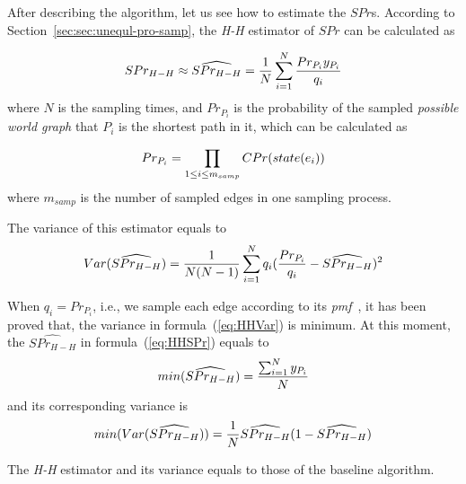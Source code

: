 \documentclass[runningheads,a4paper]{llncs}
\begin{document}
After describing the algorithm, let us see how to estimate the $SPr$s. According to Section~\ref{sec:sec:unequl-pro-samp}, the \emph{H-H} estimator of $SPr$ can be calculated as

\vspace{-0.3cm}
\begin{equation}
\label{eq:HHSPr}
SPr_{H-H}\approx\widehat{SPr_{H-H}}=\frac{1}{N}\sum_{i=1}^N\frac{Pr_{P_i}y_{P_i}}{q_i}
\vspace{-0.2cm}
\end{equation}
where $N$ is the sampling times, and $Pr_{P_i}$ is the probability of the sampled \emph{possible world graph} that $P_i$ is the shortest path in it, which can be calculated as

\vspace{-0.2cm}
\begin{equation}
\label{eq:pos-gra-pro}
Pr_{P_i}=\prod_{1\leq i\leq m_{samp}} CPr(state(e_i))
\vspace{-0.2cm}
\end{equation}
where $m_{samp}$ is the number of sampled edges in one sampling process.

The variance of this estimator equals to
\vspace{-0.4cm}
\begin{equation}
\label{eq:HHVar}
Var(\widehat{SPr_{H-H}})=\frac{1}{N(N-1)}\sum_{i=1}^Nq_i(\frac{Pr_{P_i}}{q_i}-\widehat{SPr_{H-H}})^2
\vspace{-0.3cm}
\end{equation}

When $q_i=Pr_{P_i}$, i.e., we sample each edge according to its \emph{pmf}~\cite{jin2011distance}, it has been proved that, the variance in formula~(\ref{eq:HHVar}) is minimum. At this moment, the $\widehat{SPr_{H-H}}$ in formula~(\ref{eq:HHSPr}) equals to
\vspace{-0.2cm}
\begin{equation}
\label{eq:minHHSpr}
min(\widehat{SPr_{H-H}})=\frac{\sum_{i=1}^Ny_{P_i}}{N}
\vspace{-0.2cm}
\end{equation}
and its corresponding variance is
\vspace{-0.2cm}
\begin{equation}
\label{eq:minHHVar}
min(Var(\widehat{SPr_{H-H}}))=\frac{1}{N}\widehat{SPr_{H-H}}(1-\widehat{SPr_{H-H}})
\vspace{-0.1cm}
\end{equation}

The \emph{H-H} estimator and its variance equals to those of the baseline algorithm.
\end{document}
